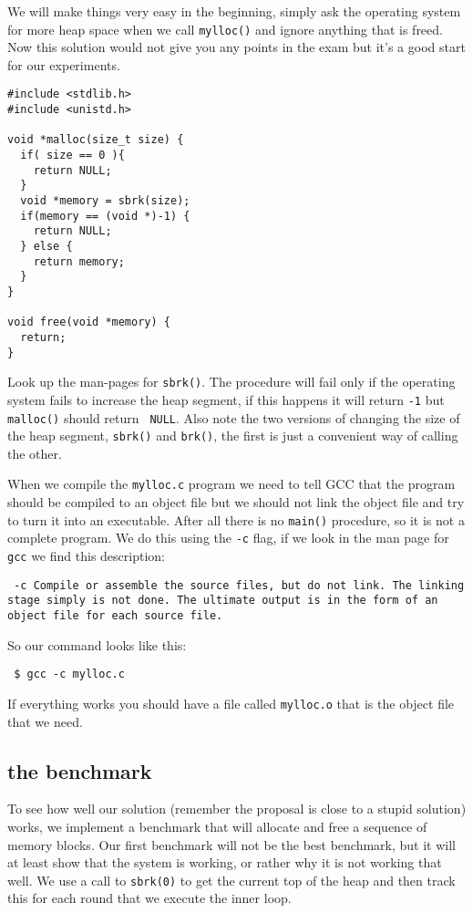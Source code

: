 \documentclass[a4paper,11pt]{article}
\begin{document}
We will make things very easy in the beginning, simply ask the
operating system for more heap space when we call {\tt mylloc()} and
 ignore anything that is freed. Now this solution would not
give you any points in the exam but it's a good start for our
experiments.

\begin{lstlisting}
#include <stdlib.h>
#include <unistd.h>

void *malloc(size_t size) {
  if( size == 0 ){
    return NULL;
  }
  void *memory = sbrk(size);
  if(memory == (void *)-1) {
    return NULL;
  } else {
    return memory;
  }
}

void free(void *memory) {
  return;
}
\end{lstlisting}

Look up the man-pages for {\tt sbrk()}. The procedure will fail only
if the operating system fails to increase the heap segment, if this
happens it will return {\tt -1} but {\tt malloc()} should return {\tt
  NULL}. Also note the two versions of changing the size of the heap
segment, {\tt sbrk()} and {\tt brk()}, the first is just a convenient
way of calling the other.

When we compile the {\tt mylloc.c} program we need to tell GCC that
the program should be compiled to an object file but we should not
link the object file and try to turn it into an executable. After all
there is no {\tt main()} procedure, so it is not a complete program.
We do this using the {\tt -c} flag, if we look in the man page for
{\tt gcc} we find this description:

\texttt{ -c Compile or assemble the source files, but do not link.
  The linking stage simply is not done.  The ultimate output is in the
  form of an object file for each source file.  }

So our command looks like this:

\begin{verbatim}
 $ gcc -c mylloc.c
\end{verbatim}

If everything works you should have a file called {\tt mylloc.o} that
is the object file that we need. 

\subsection{the benchmark}

To see how well our solution (remember the proposal is close to a
stupid solution) works, we implement a benchmark that will allocate
and free a sequence of memory blocks. Our first benchmark will not be
the best benchmark, but it will at least show that the system is
working, or rather why it is not working that well. We use a call to
{\tt sbrk(0)} to get the current top of the heap and then track this
for each round that we execute the inner loop. 
\end{document}
